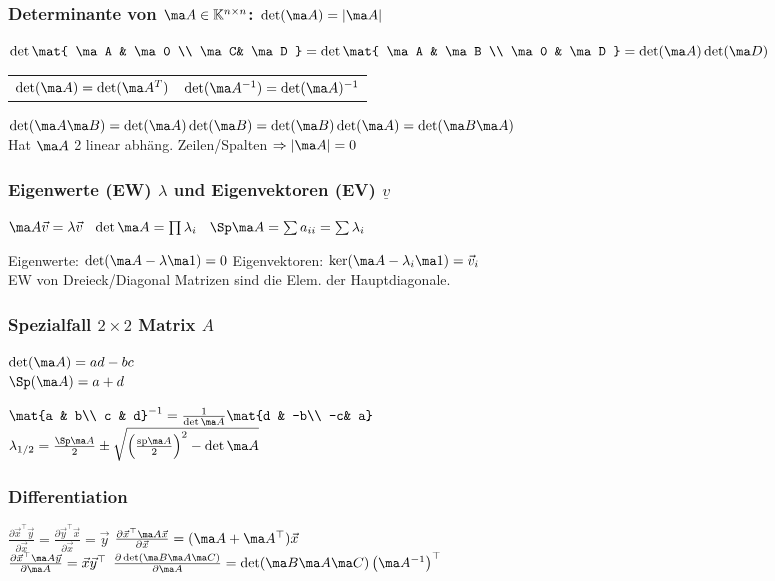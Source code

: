 \documentclass[english]{latex4ei_sheet}
\begin{document}
\begin{sectionbox}
	
	\subsubsection[Determinante]{Determinante von $\ma A\in \mathbb K^{n\times n}$: $\det(\ma A)=|\ma A|$}
	$\det\mat{ \ma A & \ma 0 \\ \ma C& \ma D }= \det\mat{ \ma A & \ma B \\ \ma 0 & \ma D } = \det(\ma A)\det(\ma D)$ \\
	\begin{tabular*}{\columnwidth}{@{\extracolsep\fill}ll}
		$\det(\ma A) = \det(\ma A^T)$ & $\det(\ma A^{-1}) = \det(\ma A)^{-1}$
	\end{tabular*}
	$\det(\ma A\ma B) = \det(\ma A)\det(\ma B) = \det(\ma B)\det(\ma A) = \det(\ma B\ma A)$\\
	Hat $\ma A$ 2 linear abhäng. Zeilen/Spalten $\Rightarrow |\ma A|=0$ \\
	
	\subsubsection{Eigenwerte (EW) $\lambda$ und Eigenvektoren (EV) $\underline v$}
	\begin{emphbox}
		\large $\ma A \vec v = \lambda \vec v$ \quad\ $\det \ma A = \prod \lambda_i$ \quad\ $\Sp \ma A = \sum a_{ii} = \sum \lambda_i$
	\end{emphbox}
	Eigenwerte: $\det(\ma A - \lambda \ma 1) = 0$ Eigenvektoren: $\ker(\ma A - \lambda_i \ma 1) = \vec v_i$\\
	EW von Dreieck/Diagonal Matrizen sind die Elem. der Hauptdiagonale.
	
	
	\subsubsection{Spezialfall $2 \times 2$ Matrix $A$}
	\parbox{3cm}{ $\det(\ma A) = ad-bc$ \\ $\Sp(\ma A) = a+d$ } $\mat{a & b\\ c & d}^{-1} = \frac{1}{\det \ma A} \mat{d & -b\\ -c& a}$\\
	$\lambda_{1/2} = \frac{\Sp \ma A}{2} \pm \sqrt{ \left( \frac{\mathrm{sp} \ma A}{2} \right)^2 - \det \ma A }$
	
	\subsubsection{Differentiation}
	$\frac{\partial \vec x^\top \vec y}{\partial \vec x} = \frac{\partial \vec y^\top \vec x}{\partial \vec x} = \vec y$\qquad
	$\frac{\partial \vec x^\top \ma A \vec x}{\partial \vec x} = (\ma A + \ma A^\top)\vec x$ \\
	$\frac{\partial \vec x^\top \ma A \vec y}{\partial \ma A} = \vec x \vec y^\top$ \qquad $\frac{\partial \det( \ma B \ma A \ma C )}{\partial \ma A} = \det(\ma B \ma A \ma C) \left( \ma A^{-1} \right)^\top$
\end{sectionbox}
\end{document}
